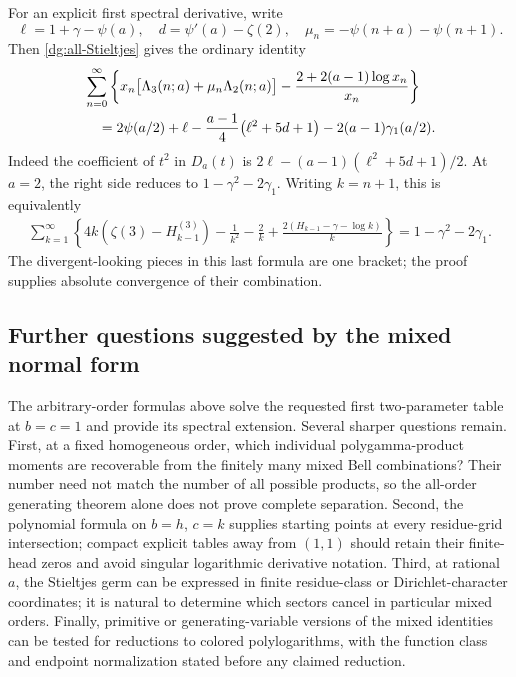 \documentclass[11pt,a4paper]{article}
\numberwithin{equation}{section}
\theoremstyle{definition}
\theoremstyle{remark}
\begin{document}
For an explicit first spectral derivative, write
\[
 \ell=1+\gamma-\psi(a),\quad
 d=\psi'(a)-\zeta(2),\quad
 \mu_n=-\psi(n+a)-\psi(n+1).
\]
Then \eqref{dg:all-Stieltjes} gives the ordinary identity
\begin{align}
 &\sum_{n=0}^{\infty}\left\{
 x_n\bigl[\Lambda_3(n;a)+\mu_n\Lambda_2(n;a)\bigr]
       -\frac{2+2(a-1)\log x_n}{x_n}\right\}\notag\\
 &\quad=2\psi(a/2)+\ell
       -\frac{a-1}{4}\bigl(\ell^2+5d+1\bigr)
       -2(a-1)\gamma_1(a/2).
 \label{dg:first-spectral}
\end{align}
Indeed the coefficient of $t^2$ in $D_a(t)$ is
$2\ell-(a-1)(\ell^2+5d+1)/2$.
At $a=2$, the right side reduces to
$1-\gamma^2-2\gamma_1$. Writing $k=n+1$, this is equivalently
\begin{align}
 \sum_{k=1}^{\infty}\left\{
 4k(\zeta(3)-H_{k-1}^{(3)})-\frac1{k^2}-\frac2k
 +\frac{2(H_{k-1}-\gamma-\log k)}k\right\}
 =1-\gamma^2-2\gamma_1.
 \label{dg:harmonic-Stieltjes}
\end{align}
The divergent-looking pieces in this last formula are one bracket;
the proof supplies absolute convergence of their combination.

\subsection{Further questions suggested by the mixed normal form}

The arbitrary-order formulas above solve the requested first
two-parameter table at $b=c=1$ and provide its spectral extension.
Several sharper questions remain. First, at a fixed homogeneous
order, which individual polygamma-product moments are recoverable
from the finitely many mixed Bell combinations? Their number need
not match the number of all possible products, so the all-order
generating theorem alone does not prove complete separation.
Second, the polynomial formula on $b=h$, $c=k$ supplies starting
points at every residue-grid intersection; compact explicit tables
away from $(1,1)$ should retain their finite-head zeros and avoid
singular logarithmic derivative notation. Third, at rational $a$,
the Stieltjes germ can be expressed in finite residue-class or
Dirichlet-character coordinates; it is natural to determine which
sectors cancel in particular mixed orders. Finally, primitive or
generating-variable versions of the mixed identities can be tested
for reductions to colored polylogarithms, with the function class
and endpoint normalization stated before any claimed reduction.
\end{document}
